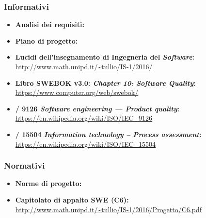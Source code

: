     \subsubsection{Informativi}
      \begin{itemize}
        \item \textbf{Analisi dei requisiti:} \VersioneAR{}
        \item \textbf{Piano di progetto:} \VersionePP{}
        \item \textbf{Lucidi dell'insegnamento di Ingegneria del \emph{Software}:}\\
        \url{http://www.math.unipd.it/~tullio/IS-1/2016/}
        \item \textbf{Libro SWEBOK v3.0: \emph{Chapter 10: Software Quality}:}\\
        \url{https://www.computer.org/web/swebok/}
        \item \textbf{/ 9126 \emph{Software engineering — Product quality}:}\\
        \url{https://en.wikipedia.org/wiki/ISO/IEC_9126}
        \item \textbf{/ 15504 \emph{Information technology – Process assessment}:}\\
        \url{https://en.wikipedia.org/wiki/ISO/IEC_15504}
      \end{itemize}
    \subsubsection{Normativi}
      \begin{itemize}
        \item \textbf{Norme di progetto:} \VersioneNP{}
        \item \textbf{Capitolato di appalto SWE (C6):}\\
        \url{http://www.math.unipd.it/~tullio/IS-1/2016/Progetto/C6.pdf}
      \end{itemize}
